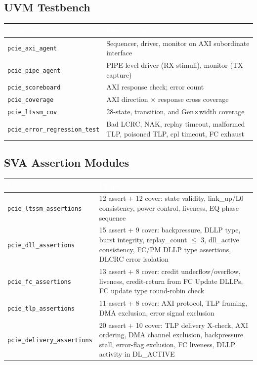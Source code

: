 \documentclass[11pt,a4paper]{article}
\newcommand{\theadcell}[1]{%
  \cellcolor{tablehead}\textcolor{white}{\textbf{#1}}}
\begin{document}
\subsection{UVM Testbench}

\begin{tabular}{lp{10cm}}
  \toprule
  \theadcell{Component} & \theadcell{Description} \\
  \midrule
  \texttt{pcie\_axi\_agent}        & Sequencer, driver, monitor on AXI subordinate interface \\
  \texttt{pcie\_pipe\_agent}       & PIPE-level driver (RX stimuli), monitor (TX capture) \\
  \texttt{pcie\_scoreboard}        & AXI response check; error count \\
  \texttt{pcie\_coverage}          & AXI direction $\times$ response cross coverage \\
  \texttt{pcie\_ltssm\_cov}        & 28-state, transition, and Gen$\times$width coverage \\
  \texttt{pcie\_error\_regression\_test} & Bad LCRC, NAK, replay timeout, malformed TLP, poisoned TLP, cpl timeout, FC exhaust \\
  \bottomrule
\end{tabular}

\subsection{SVA Assertion Modules}

\begin{tabular}{lp{9.5cm}}
  \toprule
  \theadcell{Module} & \theadcell{Properties} \\
  \midrule
  \texttt{pcie\_ltssm\_assertions}    & 12 assert + 12 cover: state validity, link\_up/L0 consistency, power control, liveness, EQ phase sequence \\
  \texttt{pcie\_dll\_assertions}      & 15 assert + 9 cover: backpressure, DLLP type, burst integrity, replay\_count $\le$ 3, dll\_active consistency, FC/PM DLLP type assertions, DLCRC error isolation \\
  \texttt{pcie\_fc\_assertions}       & 13 assert + 8 cover: credit underflow/overflow, liveness, credit-return from FC Update DLLPs, FC update type round-robin check \\
  \texttt{pcie\_tlp\_assertions}      & 11 assert + 8 cover: AXI protocol, TLP framing, DMA exclusion, error signal exclusion \\
  \texttt{pcie\_delivery\_assertions} & 20 assert + 10 cover: TLP delivery X-check, AXI ordering, DMA channel exclusion, backpressure stall, error-flag exclusion, FC liveness, DLLP activity in DL\_ACTIVE \\
  \bottomrule
\end{tabular}
\end{document}
